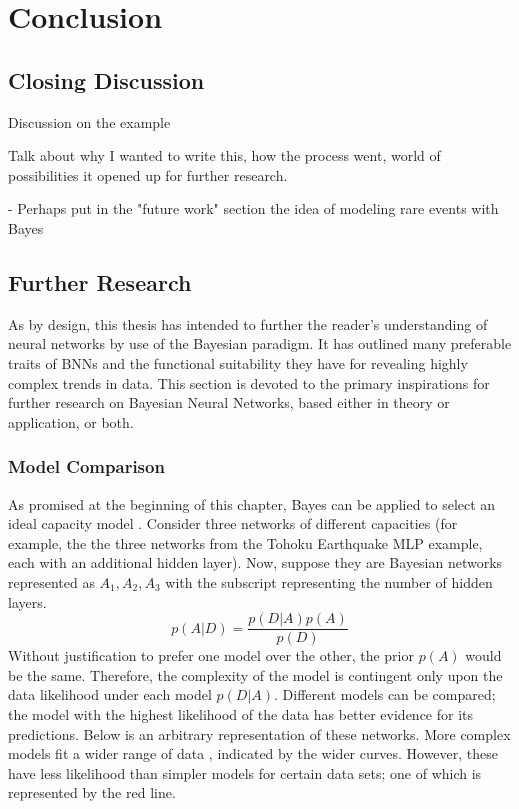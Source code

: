 \chapter{Conclusion}



\section{Closing Discussion}

Discussion on the example

Talk about why I wanted to write this, how the process went, world of possibilities it opened up for further research.

- Perhaps put in the "future work" section the idea of modeling rare events with Bayes



\section{Further Research}


As by design, this thesis has intended to further the reader's understanding of neural networks by use of the Bayesian paradigm.  It has outlined many preferable traits of BNNs and the functional suitability they have for revealing highly complex trends in data.
This section is devoted to the primary inspirations for further research on Bayesian Neural Networks, based either in theory or application, or both.

\subsection{Model Comparison}
As promised at the beginning of this chapter, Bayes can be applied to select an ideal capacity model \cite{bishop1997bayesian}.  Consider three networks of different capacities (for example, the the three networks from the Tohoku Earthquake MLP example, each with an additional hidden layer).  Now, suppose they are Bayesian networks represented as $A_1, A_2, A_3$ with the subscript representing the number of hidden layers.
$$
p(A|D) = \frac{p(D|A)p(A)}{p(D)}
$$
Without justification to prefer one model over the other, the prior $p(A)$ would be the same.  Therefore, the complexity of the model is contingent only upon the data likelihood under each model $p(D|A)$.  Different models can be compared; the model with the highest likelihood of the data has better evidence for its predictions. Below is an arbitrary representation of these networks.  More complex models fit a wider range of data \cite{bishop1997bayesian}, indicated by the wider curves.  However, these have less likelihood than simpler models for certain data sets; one of which is represented by the red line.

